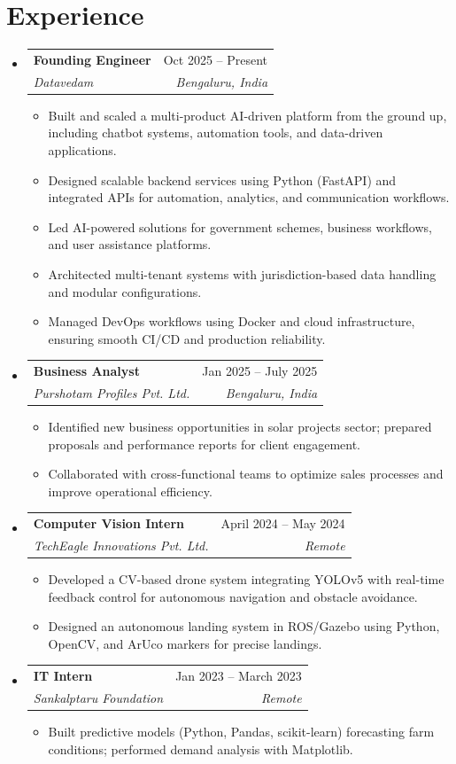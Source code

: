 \documentclass[letterpaper,10pt]{article}
\makeatletter
\newcommand{\resumeItem}[1]{
  \item\small{
    {#1 \vspace{-1pt}}
  }
}
\newcommand{\resumeSubheading}[4]{
  \vspace{-1pt}\item
    \begin{tabular*}{0.97\textwidth}[t]{l@{\extracolsep{\fill}}r}
      \textbf{#1} & #2 \\
      \textit{\small #3} & \textit{\small #4} \\
    \end{tabular*}\vspace{-5pt}
}
\newcommand{\resumeSubHeadingListStart}{\begin{itemize}[leftmargin=0.15in, label={}]}
\newcommand{\resumeSubHeadingListEnd}{\end{itemize}\vspace{-5pt}}
\newcommand{\resumeItemListStart}{\begin{itemize}\vspace{-3pt}}
\newcommand{\resumeItemListEnd}{\end{itemize}\vspace{-2pt}}
\makeatother
\begin{document}
\section{Experience}
\resumeSubHeadingListStart
    \resumeSubheading
      {Founding Engineer}{Oct 2025 -- Present}
      {Datavedam}{Bengaluru, India}
      \resumeItemListStart
        \resumeItem{Built and scaled a multi-product AI-driven platform from the ground up, including chatbot systems, automation tools, and data-driven applications.}
        \resumeItem{Designed scalable backend services using Python (FastAPI) and integrated APIs for automation, analytics, and communication workflows.}
        \resumeItem{Led AI-powered solutions for government schemes, business workflows, and user assistance platforms.}
        \resumeItem{Architected multi-tenant systems with jurisdiction-based data handling and modular configurations.}
        \resumeItem{Managed DevOps workflows using Docker and cloud infrastructure, ensuring smooth CI/CD and production reliability.}
      \resumeItemListEnd
    \resumeSubheading
      {Business Analyst}{Jan 2025 -- July 2025}
      {Purshotam Profiles Pvt. Ltd.}{Bengaluru, India}
      \resumeItemListStart
        \resumeItem{Identified new business opportunities in solar projects sector; prepared proposals and performance reports for client engagement.}
        \resumeItem{Collaborated with cross-functional teams to optimize sales processes and improve operational efficiency.}
      \resumeItemListEnd
    \resumeSubheading
      {Computer Vision Intern}{April 2024 -- May 2024}
      {TechEagle Innovations Pvt. Ltd.}{Remote}
      \resumeItemListStart
        \resumeItem{Developed a CV-based drone system integrating YOLOv5 with real-time feedback control for autonomous navigation and obstacle avoidance.}
        \resumeItem{Designed an autonomous landing system in ROS/Gazebo using Python, OpenCV, and ArUco markers for precise landings.}
      \resumeItemListEnd
    \resumeSubheading
      {IT Intern}{Jan 2023 -- March 2023}
      {Sankalptaru Foundation}{Remote}
      \resumeItemListStart
        \resumeItem{Built predictive models (Python, Pandas, scikit-learn) forecasting farm conditions; performed demand analysis with Matplotlib.}
      \resumeItemListEnd
\resumeSubHeadingListEnd
\end{document}

